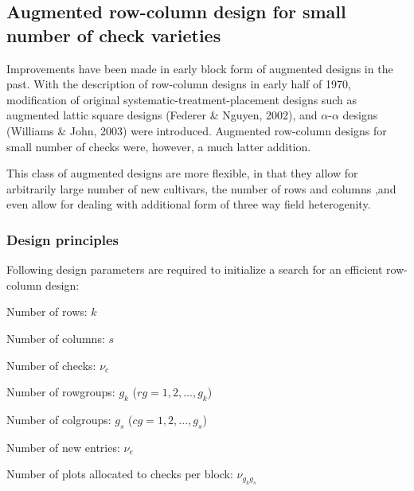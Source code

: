 \documentclass[12pt,oneside]{dukestatscithesis} %
\begin{document}
\hypertarget{aug-row-col-des}{%
\subsection{Augmented row-column design for small number of check varieties}\label{aug-row-col-des}}

Improvements have been made in early block form of augmented designs in the past. With the description of row-column designs in early half of 1970, modification of original systematic-treatment-placement designs such as augmented lattic square designs (Federer \& Nguyen, 2002), and \(\alpha\)-\(\alpha\) designs (Williams \& John, 2003) were introduced. Augmented row-column designs for small number of checks were, however, a much latter addition.

This class of augmented designs are more flexible, in that they allow for arbitrarily large number of new cultivars, the number of rows and columns ,and even allow for dealing with additional form of three way field heterogenity.

\hypertarget{des-prin-aug-row-col}{%
\subsubsection{Design principles}\label{des-prin-aug-row-col}}

Following design parameters are required to initialize a search for an efficient row-column design:

Number of rows: \(k\)

Number of columns: \(s\)

Number of checks: \(\nu_c\)

Number of rowgroups: \(g_k\) (\(rg = 1, 2, ..., g_k\))

Number of colgroups: \(g_s\) (\(cg = 1, 2, ..., g_s\))

Number of new entries: \(\nu_e\)

Number of plots allocated to checks per block: \(\nu_{g_{k}g_{s}}\)
\end{document}
